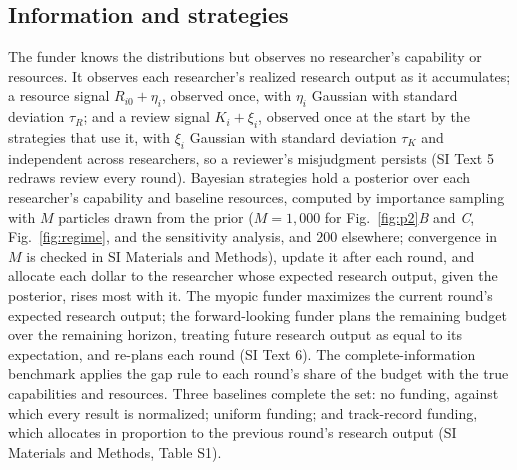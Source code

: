 \documentclass[9pt,twocolumn,twoside]{pnas-new}
\begin{document}
{\subsection*{Information and strategies} The funder knows the distributions but observes no researcher's capability or resources. It observes each researcher's realized research output as it accumulates; a resource signal $R_{i0} + \eta_i$, observed once, with $\eta_i$ Gaussian with standard deviation $\tau_R$; and a review signal $K_i + \xi_i$, observed once at the start by the strategies that use it, with $\xi_i$ Gaussian with standard deviation $\tau_K$ and independent across researchers, so a reviewer's misjudgment persists (SI Text 5 redraws review every round). Bayesian strategies hold a posterior over each researcher's capability and baseline resources, computed by importance sampling with $M$ particles drawn from the prior ($M = 1{,}000$ for Fig.~\ref{fig:p2}\textit{B} and \textit{C}, Fig.~\ref{fig:regime}, and the sensitivity analysis, and $200$ elsewhere; convergence in $M$ is checked in SI Materials and Methods), update it after each round, and allocate each dollar to the researcher whose expected research output, given the posterior, rises most with it. The myopic funder maximizes the current round's expected research output; the forward-looking funder plans the remaining budget over the remaining horizon, treating future research output as equal to its expectation, and re-plans each round (SI Text 6). The complete-information benchmark applies the gap rule to each round's share of the budget with the true capabilities and resources. Three baselines complete the set: no funding, against which every result is normalized; uniform funding; and track-record funding, which allocates in proportion to the previous round's research output (SI Materials and Methods, Table S1).

}
\end{document}
